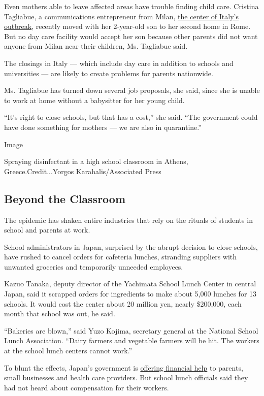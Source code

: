 Even mothers able to leave affected areas have trouble finding child
care. Cristina Tagliabue, a communications entrepreneur from Milan,
\href{https://www.nytimes.com/2020/02/24/world/europe/24coronavirus-milan-italy.html?action=click\&module=RelatedLinks\&pgtype=Article}{the
center of Italy's outbreak}, recently moved with her 2-year-old son to
her second home in Rome. But no day care facility would accept her son
because other parents did not want anyone from Milan near their
children, Ms. Tagliabue said.

The closings in Italy --- which include day care in addition to schools
and universities --- are likely to create problems for parents
nationwide.

Ms. Tagliabue has turned down several job proposals, she said, since she
is unable to work at home without a babysitter for her young child.

``It's right to close schools, but that has a cost,'' she said. ``The
government could have done something for mothers --- we are also in
quarantine.''

Image

Spraying disinfectant in a high school classroom in Athens,
Greece.Credit...Yorgos Karahalis/Associated Press

\hypertarget{beyond-the-classroom}{%
\subsection{Beyond the Classroom}\label{beyond-the-classroom}}

The epidemic has shaken entire industries that rely on the rituals of
students in school and parents at work.

School administrators in Japan, surprised by the abrupt decision to
close schools, have rushed to cancel orders for cafeteria lunches,
stranding suppliers with unwanted groceries and temporarily unneeded
employees.

Kazuo Tanaka, deputy director of the Yachimata School Lunch Center in
central Japan, said it scrapped orders for ingredients to make about
5,000 lunches for 13 schools. It would cost the center about 20 million
yen, nearly \$200,000, each month that school was out, he said.

``Bakeries are blown,'' said Yuzo Kojima, secretary general at the
National School Lunch Association. ``Dairy farmers and vegetable farmers
will be hit. The workers at the school lunch centers cannot work.''

To blunt the effects, Japan's government is
\href{https://www.japantimes.co.jp/news/2020/02/29/national/science-health/shinzo-abe-coronavirus/\#.Xl-dEBMzb-Y}{offering
financial help} to parents, small businesses and health care providers.
But school lunch officials said they had not heard about compensation
for their workers.

